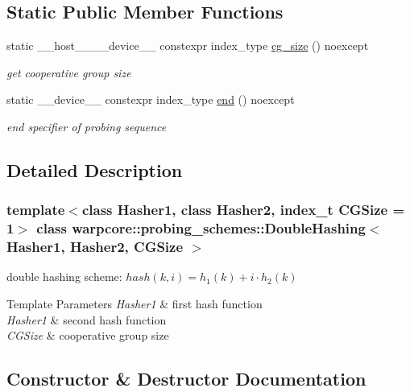 \subsection*{Static Public Member Functions}
\begin{DoxyCompactItemize}
\item 
static \+\_\+\+\_\+host\+\_\+\+\_\+\+\_\+\+\_\+device\+\_\+\+\_\+ constexpr index\+\_\+type \hyperlink{classwarpcore_1_1probing__schemes_1_1DoubleHashing_ae94c09166e06d7d1d147959ca174e1b1}{cg\+\_\+size} () noexcept
\begin{DoxyCompactList}\small\item\em get cooperative group size \end{DoxyCompactList}\item 
static \+\_\+\+\_\+device\+\_\+\+\_\+ constexpr index\+\_\+type \hyperlink{classwarpcore_1_1probing__schemes_1_1DoubleHashing_ac9ee12c8aa2a976f3fd2cdee3bac4957}{end} () noexcept
\begin{DoxyCompactList}\small\item\em end specifier of probing sequence \end{DoxyCompactList}\end{DoxyCompactItemize}


\subsection{Detailed Description}
\subsubsection*{template$<$class Hasher1, class Hasher2, index\+\_\+t C\+G\+Size = 1$>$\newline
class warpcore\+::probing\+\_\+schemes\+::\+Double\+Hashing$<$ Hasher1, Hasher2, C\+G\+Size $>$}

double hashing scheme\+: $hash(k,i) = h_1(k)+i\cdot h_2(k)$ 


\begin{DoxyTemplParams}{Template Parameters}
{\em Hasher1} & first hash function \\
\hline
{\em Hasher1} & second hash function \\
\hline
{\em C\+G\+Size} & cooperative group size \\
\hline
\end{DoxyTemplParams}


\subsection{Constructor \& Destructor Documentation}
\mbox{\label{classwarpcore_1_1probing__schemes_1_1DoubleHashing_aa74ed01c96665a5651ad4dc1395da1d2}} 
